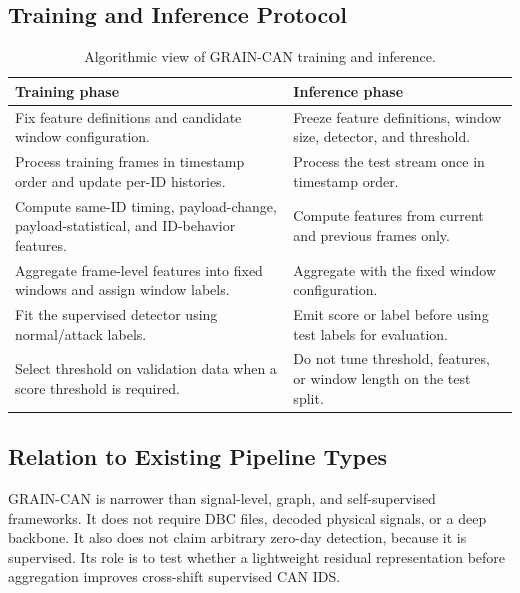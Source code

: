\documentclass[runningheads]{llncs}
\newcommand{\method}{GRAIN-CAN}
\begin{document}
\subsection{Training and Inference Protocol}
\begin{table}[t]
\caption{Algorithmic view of \method{} training and inference.}
\label{tab:algorithm}
\centering\small
\begin{tabular}{p{}p{}}
\toprule
Training phase & Inference phase \\
\midrule
Fix feature definitions and candidate window configuration. & Freeze feature definitions, window size, detector, and threshold. \\
Process training frames in timestamp order and update per-ID histories. & Process the test stream once in timestamp order. \\
Compute same-ID timing, payload-change, payload-statistical, and ID-behavior features. & Compute features from current and previous frames only. \\
Aggregate frame-level features into fixed windows and assign window labels. & Aggregate with the fixed window configuration. \\
Fit the supervised detector using normal/attack labels. & Emit score or label before using test labels for evaluation. \\
Select threshold on validation data when a score threshold is required. & Do not tune threshold, features, or window length on the test split. \\
\bottomrule
\end{tabular}
\end{table}

\subsection{Relation to Existing Pipeline Types}
\method{} is narrower than signal-level, graph, and self-supervised frameworks. It does not require DBC files, decoded physical signals, or a deep backbone. It also does not claim arbitrary zero-day detection, because it is supervised. Its role is to test whether a lightweight residual representation before aggregation improves cross-shift supervised CAN IDS.
\end{document}
